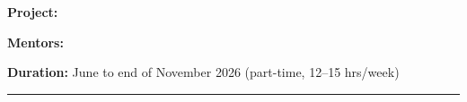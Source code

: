 {{{            \vspace{0.3cm}
            
            \begin{center}
                {\color{white}\textbf{Project:}} \projecttitle
            \end{center}
            
            \begin{center}
                {\color{white}\textbf{Mentors:}} \mentors
            \end{center}
            
            \begin{center}
                {\color{white}\textbf{Duration:}} June to end of November 2026 (part-time, 12--15 hrs/week)
            \end{center}
            
            \vspace{0.3cm}
            
            \begin{center}
                \textcolor{white}{\rule{0.8\textwidth}{0.3pt}}
            \end{center}
            
            \vspace{0.3cm}
            
            \begin{center}
                {\color{white}\textbf{\myname}}
            \end{center}
            
            \begin{center}
                {\color{white}\mydegree}
            \end{center}
            
            \begin{center}
                {\color{white}\href{\githuburl}{\color{white}\mygithub}}
            \end{center}
            
            \begin{center}
                {\color{white}\mylocation}
            \end{center}
            
            \begin{center}
                {\color{white}\texttt{\myemail}}
            \end{center}
            
            \vspace{0.8cm}
        }%
    }%
}

